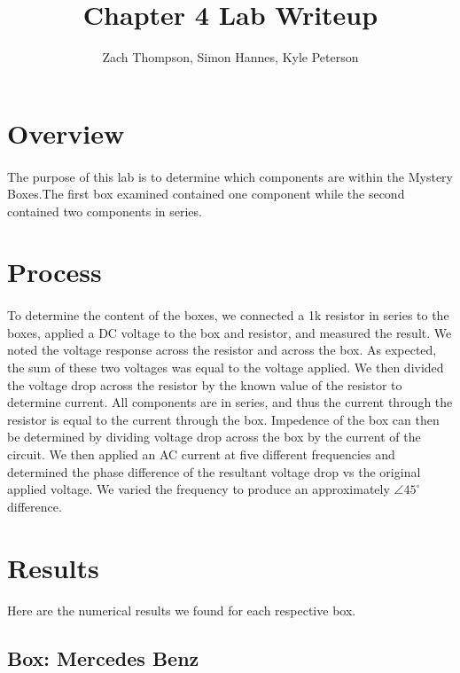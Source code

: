 \documentclass{article}
\title{Chapter 4 Lab Writeup}
\author{Zach Thompson, Simon Hannes, Kyle Peterson}
\begin{document}
\maketitle{}

\section*{Overview}
\paragraph{}
The purpose of this lab is to determine which components are within the Mystery
Boxes.The first box examined contained one component while the second contained
two components in series. 

\section*{Process}
\paragraph{}
To determine the content of the boxes, we connected a 1k resistor in series
to the boxes, applied a DC voltage to the box and resistor, and measured the
result. We noted the voltage response across the resistor and across the box.
As expected, the sum of these two voltages was equal to the voltage applied.
We then divided the voltage drop across the resistor by the known value of
the resistor to determine current. All components are in series, and thus the
current through the resistor is equal to the current through the box. Impedence
of the box can then be determined by dividing voltage drop across the box by
the current of the circuit. We then applied an AC current at five different
frequencies and determined the phase difference of the resultant voltage drop
vs the original applied voltage. We varied the frequency to produce an
approximately $\angle{}45^\circ{}$ difference.

\section*{Results}
\paragraph{}
Here are the numerical results we found for each respective box.

\subsection*{Box: Mercedes Benz}
\end{document}
